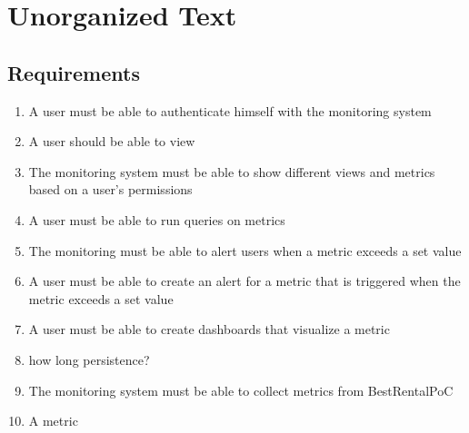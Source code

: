\chapter{Unorganized Text}




\section{Requirements}

\begin{enumerate}
	\item A user must be able to authenticate himself with the monitoring system
	\item A user should be able to view 
	\item The monitoring system must be able to show different views and metrics based on a user's permissions
	\item A user must be able to run queries on metrics
	\item The monitoring must be able to alert users when a metric exceeds a set value
	\item A user must be able to create an alert for a metric that is triggered when the metric exceeds a set value
	\item A user must be able to create dashboards that visualize a metric
	\item how long persistence?
	\item The monitoring system must be able to collect metrics from BestRentalPoC
	\item A metric 
\end{enumerate}